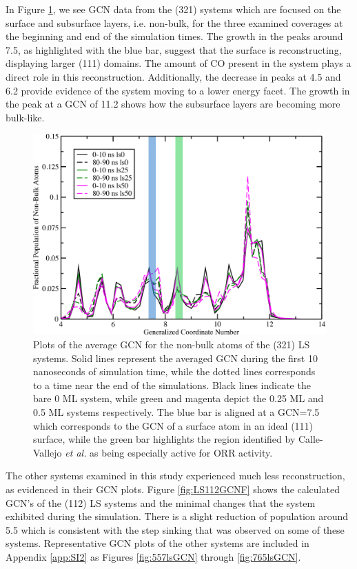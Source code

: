 In Figure \ref{fig:LS321GCNF}, we see GCN data from the  (321) systems
which are focused on the surface and subsurface layers, i.e. non-bulk, for the
three examined coverages at  the beginning and end of the simulation times. The
growth in the peaks around 7.5, as highlighted with the blue bar, suggest that
the surface is reconstructing, displaying larger (111) domains. The amount of
CO present in the system plays a direct role in this reconstruction.
Additionally, the decrease in peaks at 4.5 and 6.2 provide evidence of the
system moving to a lower energy facet.  The growth in the peak at a GCN of 11.2
shows how the subsurface layers are becoming more bulk-like.

\begin{figure}[p!]
  \includegraphics[width=\linewidth]{../figures/chap4/321ls_GCNF.pdf}
  \caption{Plots of the average GCN for the non-bulk atoms of the  (321)
LS systems.  Solid lines represent the averaged GCN during the first 10
nanoseconds of simulation time, while the dotted lines corresponds to a time near
the end of the simulations. Black lines indicate the bare 0 ML system, while
green and magenta depict the 0.25 ML and 0.5 ML systems respectively. The blue
bar is aligned at a GCN=7.5 which corresponds to the GCN of a surface atom in
an ideal  (111) surface, while the green bar highlights the region
identified by Calle-Vallejo {\em et al.} as being especially active for ORR
activity.\citep{Calle-Vallejo:2015qq}}
\label{fig:LS321GCNF}
\end{figure}

The other systems examined in this study experienced much less reconstruction,
as evidenced in their GCN plots. Figure \ref{fig:LS112GCNF} shows the
calculated GCN's of the  (112) LS systems and the minimal changes that
the system exhibited during the simulation. There is a slight reduction of
population around 5.5 which is consistent with the step sinking that was
observed on some of these systems. Representative GCN plots of the other
systems are included in Appendix \ref{app:SI2} as Figures \ref{fig:557lsGCN}
through \ref{fig:765lsGCN}.

